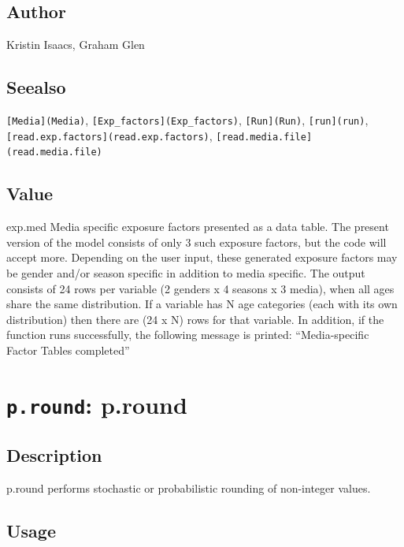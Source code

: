 \documentclass[
]{article}
\begin{document}
\hypertarget{author-23}{%
\subsection{Author}\label{author-23}}

Kristin Isaacs, Graham Glen

\hypertarget{seealso-19}{%
\subsection{Seealso}\label{seealso-19}}

\texttt{{[}Media{]}(Media)}, \texttt{{[}Exp\_factors{]}(Exp\_factors)},
\texttt{{[}Run{]}(Run)}, \texttt{{[}run{]}(run)},
\texttt{{[}read.exp.factors{]}(read.exp.factors)},
\texttt{{[}read.media.file{]}(read.media.file)}

\hypertarget{value-24}{%
\subsection{Value}\label{value-24}}

exp.med Media specific exposure factors presented as a data table. The
present version of the model consists of only 3 such exposure factors,
but the code will accept more. Depending on the user input, these
generated exposure factors may be gender and/or season specific in
addition to media specific. The output consists of 24 rows per variable
(2 genders x 4 seasons x 3 media), when all ages share the same
distribution. If a variable has N age categories (each with its own
distribution) then there are (24 x N) rows for that variable. In
addition, if the function runs successfully, the following message is
printed: ``Media-specific Factor Tables completed''

\hypertarget{p.round-p.round}{%
\section{\texorpdfstring{\texttt{p.round}:
p.round}{p.round: p.round}}\label{p.round-p.round}}

\hypertarget{description-30}{%
\subsection{Description}\label{description-30}}

p.round performs stochastic or probabilistic rounding of non-integer
values.

\hypertarget{usage-30}{%
\subsection{Usage}\label{usage-30}}
\end{document}
